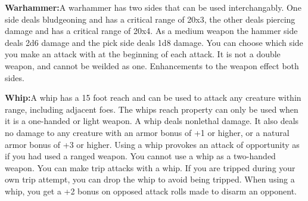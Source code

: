 \textbf{Warhammer:}{A warhammer has two sides that can be used interchangably. One side deals bludgeoning and has a critical range of 20x3, the other deals piercing damage and has a critical range of 20x4. As a medium weapon the hammer side deals 2d6 damage and the pick side deals 1d8 damage. You can choose which side you make an attack with at the beginning of each attack. It is not a double weapon, and cannot be weilded as one. Enhancements to the weapon effect both sides.}

\textbf{Whip:}{A whip has a 15 foot reach and can be used to attack any creature within range, including adjacent foes. The whips reach property can only be used when it is a one-handed or light weapon. A whip deals nonlethal damage. It also deals no damage to any creature with an armor bonus of +1 or higher, or a natural armor bonus of +3 or higher. Using a whip provokes an attack of opportunity as if you had used a ranged weapon. You cannot use a whip as a two-handed weapon. You can make trip attacks with a whip. If you are tripped during your own trip attempt, you can drop the whip to avoid being tripped. When using a whip, you get a +2 bonus on opposed attack rolls made to disarm an opponent.}